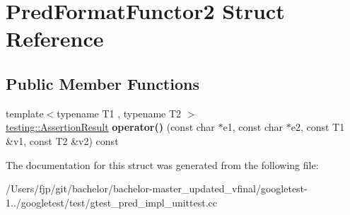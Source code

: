 \hypertarget{struct_pred_format_functor2}{}\section{Pred\+Format\+Functor2 Struct Reference}
\label{struct_pred_format_functor2}
\subsection*{Public Member Functions}
\begin{DoxyCompactItemize}
\item 
\mbox{\label{struct_pred_format_functor2_a0169e0105e15d5c63bece2a20646b22b}} 
{\footnotesize template$<$typename T1 , typename T2 $>$ }\\\mbox{\hyperlink{classtesting_1_1_assertion_result}{testing\+::\+Assertion\+Result}} {\bfseries operator()} (const char $\ast$e1, const char $\ast$e2, const T1 \&v1, const T2 \&v2) const
\end{DoxyCompactItemize}


The documentation for this struct was generated from the following file\+:\begin{DoxyCompactItemize}
\item 
/\+Users/fjp/git/bachelor/bachelor-\/master\+\_\+updated\+\_\+vfinal/googletest-\/1../googletest/test/gtest\+\_\+pred\+\_\+impl\+\_\+unittest.\+cc\end{DoxyCompactItemize}
